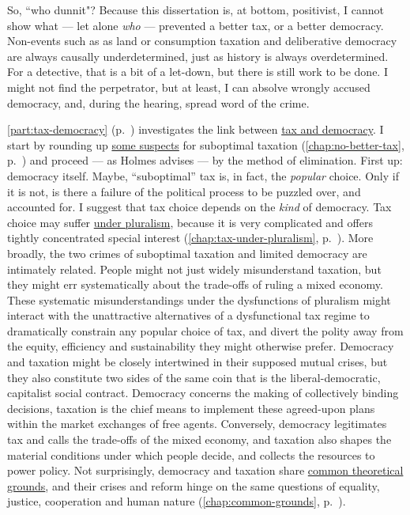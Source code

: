 So, ``who dunnit"? 
Because this dissertation is, at bottom, positivist, I cannot show what --- let alone \emph{who} --- prevented a better tax, or a better democracy.
Non-events such as as land or consumption taxation and deliberative democracy are always causally underdetermined, just as history is always overdetermined. 
For a detective, that is a bit of a let-down, but there is still work to be done. 
I might not find the perpetrator, but at least, I can absolve wrongly accused democracy, and, during the hearing, spread word of  the crime.

\autoref{part:tax-democracy} (p.~\pageref{part:tax-democracy}) investigates the link between \hyperref[part:tax-democracy]{tax and democracy}. I start by rounding up \hyperref[chap:no-better-tax]{some suspects} for suboptimal taxation (\autoref{chap:no-better-tax}, p.~\pageref{chap:no-better-tax}) and proceed --- as Holmes advises --- by the method of elimination. 
First up: democracy itself. 
Maybe, ``suboptimal'' tax is, in fact, the \emph{popular} choice. 
Only if it is not, is there a failure of the political process to be puzzled over, and accounted for. 
I suggest that tax choice depends on the \emph{kind} of democracy. 
Tax choice may suffer \hyperref[chap:tax-under-pluralism]{under pluralism}, because it is very complicated and offers tightly concentrated special interest (\autoref{chap:tax-under-pluralism}, p.~\pageref{chap:tax-under-pluralism}). 
More broadly, the two crimes of suboptimal taxation and limited democracy are intimately related. 
People might not just widely misunderstand taxation, but they might err systematically about the trade-offs of ruling a mixed economy. 
These systematic misunderstandings under the dysfunctions of pluralism might interact with the unattractive alternatives of a dysfunctional tax regime to dramatically constrain any popular choice of tax, and divert the polity away from the equity, efficiency and sustainability they might otherwise prefer. 
Democracy and taxation might be closely intertwined in their supposed mutual crises, but they also constitute two sides of the same coin that is the liberal-democratic, capitalist social contract. 
Democracy concerns the making of collectively binding decisions, taxation is the chief means to implement these agreed-upon plans within the market exchanges of free agents. 
Conversely, democracy legitimates tax and calls the trade-offs of the mixed economy, and taxation also shapes the material conditions under which people decide, and collects the resources to power policy. 
Not surprisingly, democracy and taxation share \hyperref[chap:common-grounds]{common theoretical grounds}, and their crises and reform hinge on the same questions of equality, justice, cooperation and human nature (\autoref{chap:common-grounds}, p.~\pageref{chap:common-grounds}). %

